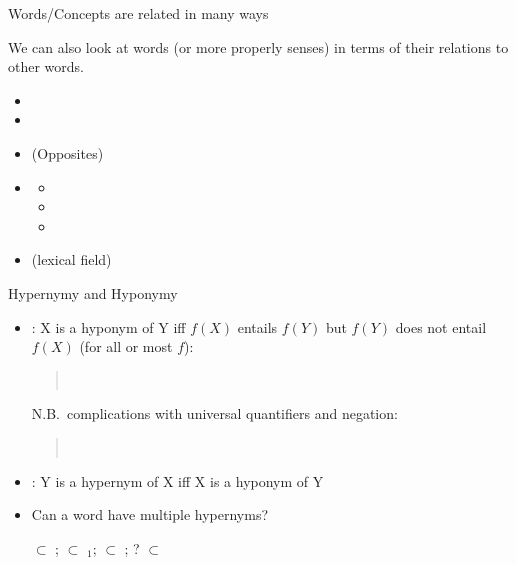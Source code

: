 \documentclass{beamer}
\begin{document}
\begin{frame}{Words/Concepts are related in many ways}

We can also look at words (or more properly senses) in terms of their
relations to other words.

\begin{itemize}
\item {}
\item {}
\item {} (Opposites)
\item {}
    \begin{itemize}
    \item {}
    \item {}
    \item {}
    \end{itemize}
  \item {} (lexical field)
\end{itemize}




\end{frame}

\begin{frame}{Hypernymy and Hyponymy}

\begin{itemize}
\item {}: X is a hyponym of Y iff
  $f(X)$ entails $f(Y)$ but $f(Y)$ does not entail $f(X)$ (for all or most $f$):
  \begin{quote}
    \\
  \end{quote}
  N.B.\ complications with universal quantifiers and negation:
  \begin{quote}
    \\
  \end{quote}
\item {}: Y is a hypernym of X iff X is a hyponym of Y
\item Can a word have multiple hypernyms?
  \begin{exe}
    \ex {} $\subset$ ; $\subset$ $_1$; 
    $\subset$ ; ? $\subset$ 
  \end{exe}
\end{itemize}

\end{frame}
\end{document}
